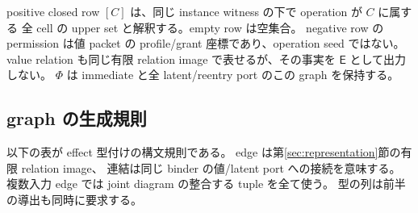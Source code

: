 \documentclass[11pt,a4paper]{article}
\begin{document}
positive closed row \([C]\) は、同じ instance witness の下で operation が \(C\) に属する
全 cell の upper set と解釈する。empty row は空集合。
negative row の permission は値 packet の profile/grant 座標であり、operation seed ではない。
value relation も同じ有限 relation image で表せるが、その事実を \(\mathsf E\) として出力しない。
\(\Phi\) は immediate と全 latent/reentry port のこの graph を保持する。

\subsection{graph の生成規則}

以下の表が effect 型付けの構文規則である。
edge は第\ref{sec:representation}節の有限 relation image、
連結は同じ binder の値/latent port への接続を意味する。
複数入力 edge では joint diagram の整合する tuple を全て使う。
型の列は前半の導出も同時に要求する。
\end{document}
